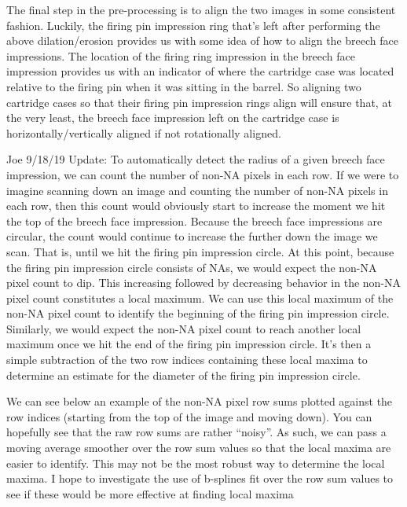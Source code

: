 \documentclass[]{book}
\begin{document}
The final step in the pre-processing is to align the two images in some consistent fashion. Luckily, the firing pin impression ring that's left after performing the above dilation/erosion provides us with some idea of how to align the breech face impressions. The location of the firing ring impression in the breech face impression provides us with an indicator of where the cartridge case was located relative to the firing pin when it was sitting in the barrel. So aligning two cartridge cases so that their firing pin impression rings align will ensure that, at the very least, the breech face impression left on the cartridge case is horizontally/vertically aligned if not rotationally aligned.

Joe 9/18/19 Update: To automatically detect the radius of a given breech face impression, we can count the number of non-NA pixels in each row. If we were to imagine scanning down an image and counting the number of non-NA pixels in each row, then this count would obviously start to increase the moment we hit the top of the breech face impression. Because the breech face impressions are circular, the count would continue to increase the further down the image we scan. That is, until we hit the firing pin impression circle. At this point, because the firing pin impression circle consists of NAs, we would expect the non-NA pixel count to dip. This increasing followed by decreasing behavior in the non-NA pixel count constitutes a local maximum. We can use this local maximum of the non-NA pixel count to identify the beginning of the firing pin impression circle. Similarly, we would expect the non-NA pixel count to reach another local maximum once we hit the end of the firing pin impression circle. It's then a simple subtraction of the two row indices containing these local maxima to determine an estimate for the diameter of the firing pin impression circle.

We can see below an example of the non-NA pixel row sums plotted against the row indices (starting from the top of the image and moving down). You can hopefully see that the raw row sums are rather ``noisy''. As such, we can pass a moving average smoother over the row sum values so that the local maxima are easier to identify. This may not be the most robust way to determine the local maxima. I hope to investigate the use of b-splines fit over the row sum values to see if these would be more effective at finding local maxima
\end{document}
